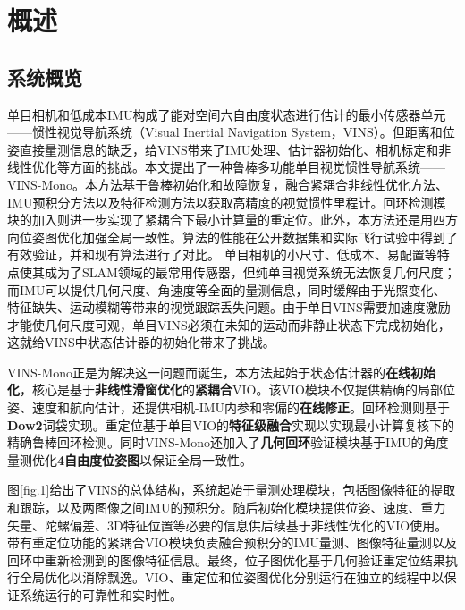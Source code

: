\section{概述}  %
\subsection{系统概览}
单目相机和低成本IMU构成了能对空间六自由度状态进行估计的最小传感器单元——惯性视觉导航系统（Visual Inertial Navigation System，VINS）。但距离和位姿直接量测信息的缺乏，给VINS带来了IMU处理、估计器初始化、相机标定和非线性优化等方面的挑战。本文提出了一种鲁棒多功能单目视觉惯性导航系统——VINS-Mono。本方法基于鲁棒初始化和故障恢复，融合紧耦合非线性优化方法、IMU预积分方法以及特征检测方法以获取高精度的视觉惯性里程计。回环检测模块的加入则进一步实现了紧耦合下最小计算量的重定位。此外，本方法还是用四方向位姿图优化加强全局一致性。算法的性能在公开数据集和实际飞行试验中得到了有效验证，并和现有算法进行了对比。
单目相机的小尺寸、低成本、易配置等特点使其成为了SLAM领域的最常用传感器，但纯单目视觉系统无法恢复几何尺度；而IMU可以提供几何尺度、角速度等全面的量测信息，同时缓解由于光照变化、特征缺失、运动模糊等带来的视觉跟踪丢失问题。由于单目VINS需要加速度激励才能使几何尺度可观，单目VINS必须在未知的运动而非静止状态下完成初始化，这就给VINS中状态估计器的初始化带来了挑战。

VINS-Mono正是为解决这一问题而诞生，本方法起始于状态估计器的\textbf{在线初始化}，核心是基于\textbf{非线性滑窗优化}的\textbf{紧耦合}VIO。该VIO模块不仅提供精确的局部位姿、速度和航向估计，还提供相机-IMU内参和零偏的\textbf{在线修正}。回环检测则基于\textbf{Dow2}词袋实现。重定位基于单目VIO的\textbf{特征级融合}实现以实现最小计算复核下的精确鲁棒回环检测。同时VINS-Mono还加入了\textbf{几何回环}验证模块基于IMU的角度量测优化\textbf{4自由度位姿图}以保证全局一致性。

图\ref{fig.1}给出了VINS的总体结构，系统起始于量测处理模块，包括图像特征的提取和跟踪，以及两图像之间IMU的预积分。随后初始化模块提供位姿、速度、重力矢量、陀螺偏差、3D特征位置等必要的信息供后续基于非线性优化的VIO使用。带有重定位功能的紧耦合VIO模块负责融合预积分的IMU量测、图像特征量测以及回环中重新检测到的图像特征信息。最终，位子图优化基于几何验证重定位结果执行全局优化以消除飘逸。VIO、重定位和位姿图优化分别运行在独立的线程中以保证系统运行的可靠性和实时性。

